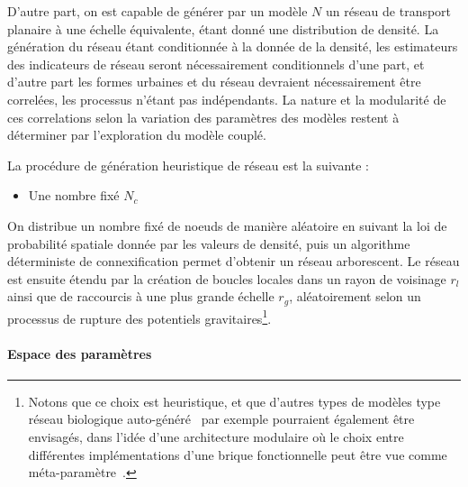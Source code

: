 D'autre part, on est capable de générer par un modèle $N$ un réseau de transport planaire à une échelle équivalente, étant donné une distribution de densité. La génération du réseau étant conditionnée à la donnée de la densité, les estimateurs des indicateurs de réseau seront nécessairement conditionnels d'une part, et d'autre part les formes urbaines et du réseau devraient nécessairement être correlées, les processus n'étant pas indépendants. La nature et la modularité de ces correlations selon la variation des paramètres des modèles restent à déterminer par l'exploration du modèle couplé.

La procédure de génération heuristique de réseau est la suivante :
\begin{itemize}
\item Une nombre fixé $N_c$

\end{itemize}

On distribue un nombre fixé de noeuds de manière aléatoire en suivant la loi de probabilité spatiale donnée par les valeurs de densité, puis un algorithme déterministe de connexification permet d'obtenir un réseau arborescent. Le réseau est ensuite étendu par la création de boucles locales dans un rayon de voisinage $r_l$ ainsi que de raccourcis à une plus grande échelle $r_g$, aléatoirement selon un processus de rupture des potentiels gravitaires\footnote{Notons que ce choix est heuristique, et que d'autres types de modèles type réseau biologique auto-généré~\cite{tero2006physarum} par exemple pourraient également être envisagés, dans l'idée d'une architecture modulaire où le choix entre différentes implémentations d'une brique fonctionnelle peut être vue comme méta-paramètre~\cite{cottineau2015incremental}.}.







\paragraph{Espace des paramètres}






